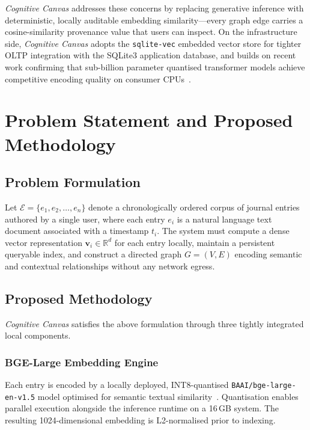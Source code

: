 \documentclass[12pt]{article}
\newcommand{\CC}{\textit{Cognitive Canvas}}
\begin{document}
\CC{} addresses these concerns by replacing generative inference with deterministic, locally auditable embedding similarity---every graph edge carries a cosine-similarity provenance value that users can inspect. On the infrastructure side, \CC{} adopts the \texttt{sqlite-vec} embedded vector store for tighter OLTP integration with the SQLite3 application database, and builds on recent work confirming that sub-billion parameter quantised transformer models achieve competitive encoding quality on consumer CPUs~\cite{dettmers2022llmint8, johnson2021faiss}.

\section{Problem Statement and Proposed Methodology}

\subsection{Problem Formulation}

Let $\mathcal{E} = \{e_1, e_2, \ldots, e_n\}$ denote a chronologically ordered corpus of journal entries authored by a single user, where each entry $e_i$ is a natural language text document associated with a timestamp $t_i$. The system must compute a dense vector representation $\mathbf{v}_i \in \mathbb{R}^d$ for each entry locally, maintain a persistent queryable index, and construct a directed graph $G = (V, E)$ encoding semantic and contextual relationships without any network egress. 

\subsection{Proposed Methodology}

\CC{} satisfies the above formulation through three tightly integrated local components.

\subsubsection{BGE-Large Embedding Engine}
Each entry is encoded by a locally deployed, INT8-quantised \texttt{BAAI/bge-large-en-v1.5} model optimised for semantic textual similarity~\cite{dettmers2022llmint8}. Quantisation enables parallel execution alongside the inference runtime on a 16\,GB system. The resulting 1024-dimensional embedding is L2-normalised prior to indexing.
\end{document}
